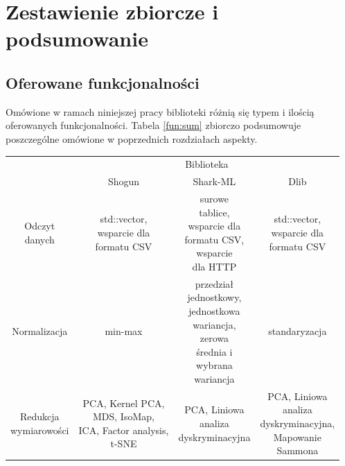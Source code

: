 \chapter{Zestawienie zbiorcze i podsumowanie}

\section{Oferowane funkcjonalności}

Omówione w ramach niniejszej pracy biblioteki różnią się typem i ilością oferowanych funkcjonalności. Tabela \ref{fun:sum} zbiorczo podsumowuje poszczególne omówione w poprzednich rozdziałach aspekty.

\begin{longtable}{c | c | c | c}
	\centering
	\multirow{2}{*}{\makecell{Funkcjonalność}} & \multicolumn{3}{c}{Biblioteka} \\
	\cline{2-4}
	 &  Shogun & Shark-ML & Dlib \\
	\hline
	\makecell{Odczyt \\ danych} & \makecell{std::vector, \\ wsparcie dla \\ formatu CSV} & \makecell{surowe \\ tablice, \\ wsparcie dla \\ formatu CSV, \\ wsparcie \\ dla HTTP} & \makecell{std::vector, \\ wsparcie dla \\ formatu CSV} \\
	\hline
	{Normalizacja} & min-max & \makecell{przedział \\ jednostkowy, \\ jednostkowa \\ wariancja, \\ zerowa \\ średnia i \\ wybrana \\ wariancja} & standaryzacja \\
	\hline
	\makecell{Redukcja \\ wymiarowości} & \makecell{PCA, Kernel PCA, \\ MDS, IsoMap, \\ ICA, Factor analysis, \\t-SNE} & \makecell{PCA, Liniowa \\ analiza \\ dyskryminacyjna} & \makecell{PCA, Liniowa \\ analiza \\ dyskryminacyjna, \\ Mapowanie \\ Sammona} \\

\end{longtable}
